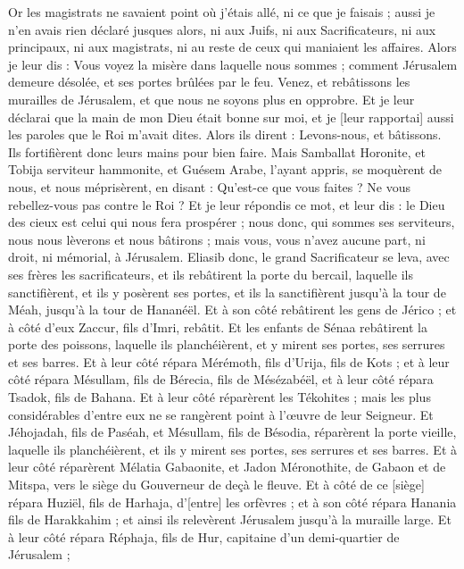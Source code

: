 \begin{multicols}{2}
Or les magistrats ne savaient point où j'étais allé, ni ce que je faisais ; aussi je n'en avais rien déclaré jusques alors, ni aux Juifs, ni aux Sacrificateurs, ni aux principaux, ni aux magistrats, ni au reste de ceux qui maniaient les affaires.
Alors je leur dis : Vous voyez la misère dans laquelle nous sommes ; comment Jérusalem demeure désolée, et ses portes brûlées par le feu. Venez, et rebâtissons les murailles de Jérusalem, et que nous ne soyons plus en opprobre.
Et je leur déclarai que la main de mon Dieu était bonne sur moi, et je [leur rapportai] aussi les paroles que le Roi m'avait dites. Alors ils dirent : Levons-nous, et bâtissons. Ils fortifièrent donc leurs mains pour bien faire.
Mais Samballat Horonite, et Tobija serviteur hammonite, et Guésem Arabe, l'ayant appris, se moquèrent de nous, et nous méprisèrent, en disant : Qu'est-ce que vous faites ? Ne vous rebellez-vous pas contre le Roi ?
Et je leur répondis ce mot, et leur dis : le Dieu des cieux est celui qui nous fera prospérer ; nous donc, qui sommes ses serviteurs, nous nous lèverons et nous bâtirons ; mais vous, vous n'avez aucune part, ni droit, ni mémorial, à Jérusalem.
\VerseOne{}Eliasib donc, le grand Sacrificateur se leva, avec ses frères les sacrificateurs, et ils rebâtirent la porte du bercail, laquelle ils sanctifièrent, et ils y posèrent ses portes, et ils la sanctifièrent jusqu'à la tour de Méah, jusqu'à la tour de Hananéël.
Et à son côté rebâtirent les gens de Jérico ; et à côté d'eux Zaccur, fils d'Imri, rebâtit.
Et les enfants de Sénaa rebâtirent la porte des poissons, laquelle ils planchéièrent, et y mirent ses portes, ses serrures et ses barres.
Et à leur côté répara Mérémoth, fils d'Urija, fils de Kots ; et à leur côté répara Mésullam, fils de Bérecia, fils de Mésézabéël, et à leur côté répara Tsadok, fils de Bahana.
Et à leur côté réparèrent les Tékohites ; mais les plus considérables d'entre eux ne se rangèrent point à l'œuvre de leur Seigneur.
Et Jéhojadah, fils de Paséah, et Mésullam, fils de Bésodia, réparèrent la porte vieille, laquelle ils planchéièrent, et ils y mirent ses portes, ses serrures et ses barres.
Et à leur côté réparèrent Mélatia Gabaonite, et Jadon Méronothite, de Gabaon et de Mitspa, vers le siège du Gouverneur de deçà le fleuve.
Et à côté de ce [siège] répara Huziël, fils de Harhaja, d'[entre] les orfèvres ; et à son côté répara Hanania fils de Harakkahim ; et ainsi ils relevèrent Jérusalem jusqu'à la muraille large.
Et à leur côté répara Réphaja, fils de Hur, capitaine d'un demi-quartier de Jérusalem ;

\end{multicols}
